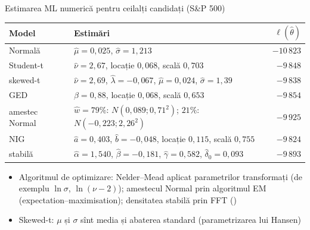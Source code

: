 \begin{frame}{Estimarea ML numerică pentru ceilalți candidați (S\&P 500)}
\itemsize{\footnotesize}
\begin{center}
\scriptsize
\begin{tabular}{l>{\raggedright\arraybackslash}p{6.6cm}r}
\toprule
\textbf{Model} & \textbf{Estimări} & $\ell(\hat\theta)$ \\
\midrule
Normală & $\hat\mu = 0{,}025$, $\hat\sigma = 1{,}213$ & $-10\,823$ \\
Student-t & $\hat\nu = 2{,}67$, locație $0{,}068$, scală $0{,}703$ & $-9\,848$ \\
skewed-t & $\hat\nu = 2{,}69$, $\hat\lambda = -0{,}067$, $\hat\mu = 0{,}024$, $\hat\sigma = 1{,}39$ & $-9\,838$ \\
GED & $\hat\beta = 0{,}88$, locație $0{,}068$, scală $0{,}653$ & $-9\,854$ \\
amestec Normal & $\hat w = 79\%$: $N(0{,}089; 0{,}71^2)$; $21\%$: $N(-0{,}223; 2{,}26^2)$ & $-9\,925$ \\
NIG & $\hat a = 0{,}403$, $\hat b = -0{,}048$, locație $0{,}115$, scală $0{,}755$ & $-9\,824$ \\
stabilă & $\hat\alpha = 1{,}540$, $\hat\beta = -0{,}181$, $\hat\gamma = 0{,}582$, $\hat\delta_0 = 0{,}093$ & $-9\,893$ \\
\bottomrule
\end{tabular}
\end{center}
\begin{itemize}
    \item Algoritmul de optimizare: Nelder--Mead aplicat parametrilor transformați (de exemplu $\ln\sigma$, $\ln(\nu - 2)$); amestecul Normal prin algoritmul EM (expectation--maximisation); densitatea stabilă prin FFT ()
    \item Skewed-t: $\mu$ și $\sigma$ sînt media și abaterea standard (parametrizarea lui Hansen)
\end{itemize}
\end{frame}

